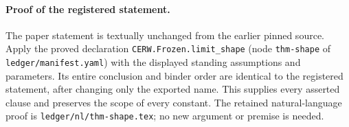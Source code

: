 \paragraph{Proof of the registered statement.}
The paper statement is textually unchanged from the earlier pinned source.
Apply the proved declaration \texttt{CERW.Frozen.limit\_shape}
(node \texttt{thm-shape} of \texttt{ledger/manifest.yaml}) with the displayed
standing assumptions and parameters. Its entire conclusion and binder order
are identical to the registered statement, after changing only the exported
name. This supplies every asserted clause and preserves the scope of every
constant. The retained natural-language proof is
\texttt{ledger/nl/thm-shape.tex}; no new argument or premise is needed.
